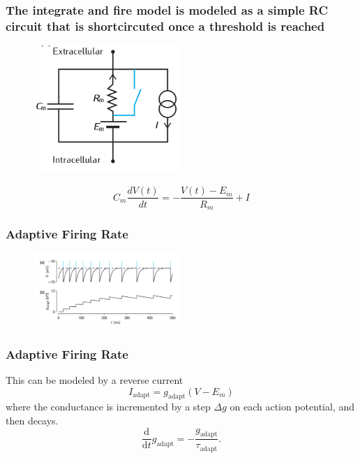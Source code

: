 \documentclass{beamer}
\begin{document}
\begin{frame}
 \frametitle{The integrate and fire model is modeled as a simple RC circuit that is shortcircuted once a threshold is reached}

\begin{figure}
 \includegraphics[width = 0.5\textwidth]{figures/rcA.png}
 \end{figure}
\pause
\begin{equation*}
C_m \frac{dV(t)}{dt} = - \frac{V(t) - E_m}{R_m} + I
\end{equation*}
 \end{frame}


\begin{frame}
	\frametitle{Adaptive Firing Rate}
	\begin{figure}
		\includegraphics[width = 0.5\textwidth]{figures/adaptation.png}
	\end{figure}
\end{frame}

\begin{frame}
	\frametitle{Adaptive Firing Rate}
	This can be modeled by a reverse current
	$$
 I_{\mathrm{adapt}} =  g_{\mathrm{adapt}}(V - E_m)
$$
where the conductance is incremented by a step $\Delta g$ on each action potential, and then decays.
$$
\frac{\mathrm{d}}{\mathrm{d}t} g_{\mathrm{adapt}}=-\frac{g_{\mathrm{adapt}}}{\tau_{\mathrm{adapt}}}.
$$
\end{frame}
\end{document}
